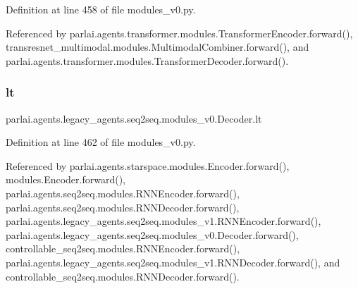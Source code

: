 Definition at line 458 of file modules\+\_\+v0.\+py.



Referenced by parlai.\+agents.\+transformer.\+modules.\+Transformer\+Encoder.\+forward(), transresnet\+\_\+multimodal.\+modules.\+Multimodal\+Combiner.\+forward(), and parlai.\+agents.\+transformer.\+modules.\+Transformer\+Decoder.\+forward().

\mbox{\label{classparlai_1_1agents_1_1legacy__agents_1_1seq2seq_1_1modules__v0_1_1Decoder_afa91f5507de425b7e977c54cda5d710e}} 
\subsubsection{\texorpdfstring{lt}{lt}}
{\footnotesize\ttfamily parlai.\+agents.\+legacy\+\_\+agents.\+seq2seq.\+modules\+\_\+v0.\+Decoder.\+lt}



Definition at line 462 of file modules\+\_\+v0.\+py.



Referenced by parlai.\+agents.\+starspace.\+modules.\+Encoder.\+forward(), modules.\+Encoder.\+forward(), parlai.\+agents.\+seq2seq.\+modules.\+R\+N\+N\+Encoder.\+forward(), parlai.\+agents.\+seq2seq.\+modules.\+R\+N\+N\+Decoder.\+forward(), parlai.\+agents.\+legacy\+\_\+agents.\+seq2seq.\+modules\+\_\+v1.\+R\+N\+N\+Encoder.\+forward(), parlai.\+agents.\+legacy\+\_\+agents.\+seq2seq.\+modules\+\_\+v0.\+Decoder.\+forward(), controllable\+\_\+seq2seq.\+modules.\+R\+N\+N\+Encoder.\+forward(), parlai.\+agents.\+legacy\+\_\+agents.\+seq2seq.\+modules\+\_\+v1.\+R\+N\+N\+Decoder.\+forward(), and controllable\+\_\+seq2seq.\+modules.\+R\+N\+N\+Decoder.\+forward().

\mbox{\label{classparlai_1_1agents_1_1legacy__agents_1_1seq2seq_1_1modules__v0_1_1Decoder_a0a6bc4b07be34760e42add6dfbbf736b}} 
